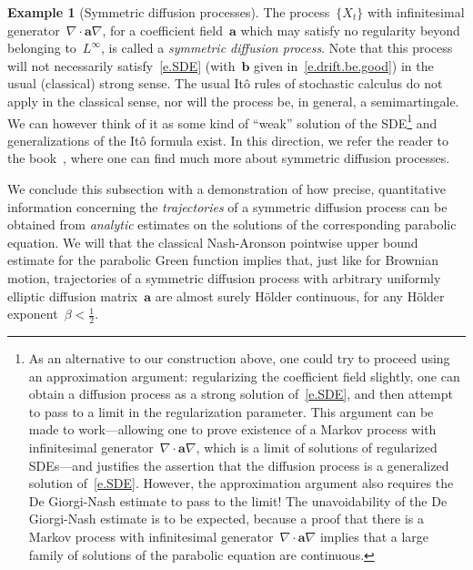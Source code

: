 \documentclass[11pt]{article} %
\numberwithin{equation}{section}
\theoremstyle{definition}
\newtheorem{example}[theorem]{Example}
\renewcommand{\b}{\ensuremath{\mathbf{b}}}
\renewcommand{\a}{\mathbf{a}}
\begin{document}
\begin{example}[Symmetric diffusion processes]
\smallskip

The process~$\{X_t\}$ with infinitesimal generator~$\nabla\cdot\a\nabla$, for a coefficient field~$\a$ which may satisfy no regularity beyond belonging to~$L^\infty$, is called a \emph{symmetric diffusion process}.
Note that this process will not necessarily satisfy~\eqref{e.SDE} (with~$\b$ given in~\eqref{e.drift.be.good}) in the usual (classical) strong sense. 
The usual It\^o rules of stochastic calculus do not apply in the classical sense, nor will the process be, in general, a semimartingale. 
We can however think of it as some kind of ``weak'' solution of the SDE\footnote{As an alternative to our construction above, one could try to proceed using an approximation argument: regularizing the coefficient field slightly, one can obtain a diffusion process as a strong solution of~\eqref{e.SDE}, and then attempt to pass to a limit in the regularization parameter. This argument can be made to work---allowing one to prove existence of a Markov process with infinitesimal generator~$\nabla \cdot\a\nabla$, which is a limit of solutions of regularized SDEs---and justifies the assertion that the diffusion process is a generalized solution of~\eqref{e.SDE}. However, the approximation argument also requires the De Giorgi-Nash estimate to pass to the limit! The unavoidability of the De Giorgi-Nash estimate is to be expected, because a proof that there is a Markov process with infinitesimal generator~$\nabla \cdot \a\nabla$ implies that a large family of solutions of the parabolic equation are continuous.}  
and generalizations of the It\^o formula exist. In this direction, we refer the reader to the book~\cite{Fuku}, where one can find much more about symmetric diffusion processes.
\end{example}



We conclude this subsection with a demonstration of how precise, quantitative information concerning the \emph{trajectories} of a symmetric diffusion process can be obtained from \emph{analytic} estimates on the solutions of the corresponding parabolic equation. We will that the classical Nash-Aronson pointwise upper bound estimate for the parabolic Green function implies that, just like for Brownian motion, trajectories of a symmetric diffusion process with arbitrary uniformly elliptic diffusion matrix~$\a$ are almost surely H\"older continuous, for any H\"older exponent~$\beta<\frac12$. 

\smallskip
\end{document}
